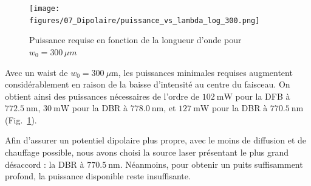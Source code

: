 \medskip


\begin{figure}[H]
    \centering
    \texttt{[image: figures/07\_Dipolaire/puissance\_vs\_lambda\_log\_300.png]}
    \caption{Puissance requise en fonction de la longueur d'onde pour $w_0 = 300 \, \mu m$ }
    \label{chap7:fig:puiss.2}
\end{figure}

\medskip


Avec un waist de $w_0 = 300~\mu\text{m}$, les puissances minimales requises augmentent considérablement en raison de la baisse d’intensité au centre du faisceau. On obtient ainsi des puissances nécessaires de l’ordre de $102~\text{mW}$ pour la DFB à $772.5~\text{nm}$, $30~\text{mW}$ pour la DBR à $778.0~\text{nm}$, et $127~\text{mW}$ pour la DBR à $770.5~\text{nm}$ (Fig.~\ref{chap7:fig:puiss.2}).  

\medskip

Afin d’assurer un potentiel dipolaire plus propre, avec le moins de diffusion et de chauffage possible, nous avons choisi la source laser présentant le plus grand désaccord : la DBR à $770.5~\text{nm}$. Néanmoins, pour obtenir un puits suffisamment profond, la puissance disponible reste insuffisante.  

